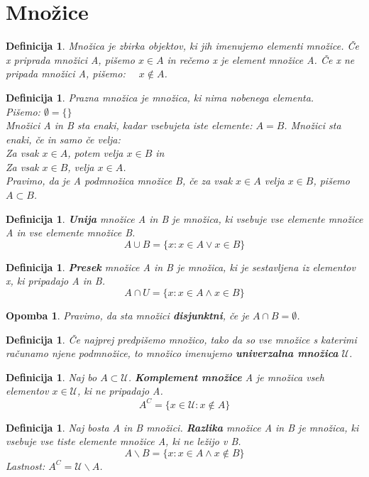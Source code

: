\documentclass[11pt]{article}
\newtheorem{Definicija}[Izrek]{{\sc Definicija}}
\newtheorem{Opomba}[Izrek]{{\sc Opomba}}
\begin{document}
\section{Množice}
\begin{Definicija}
	Množica je zbirka objektov, ki jih imenujemo elementi množice. Če x priprada množici A, pišemo $x\in A$ in rečemo x je element množice A.
	Če x ne pripada množici A, pišemo: $\quad x\notin A$.
\end{Definicija}
\begin{Definicija}
	Prazna množica je množica, ki nima nobenega elementa. \\
	Pišemo: $\emptyset = \{\}$
	\\
	Množici A in B sta enaki, kadar vsebujeta iste elemente: $A=B$. Množici sta enaki, če in samo če velja:
	\\
	Za vsak $x\in A$, potem velja $x\in B$ in
	\\
	Za vsak $x\in B$, velja $x\in A$.
	\\
	Pravimo, da je A podmnožica množice B, če za vsak $x\in A $ velja $x\in B$, pišemo $A\subset B$.
\end{Definicija}
\begin{Definicija}
	\textbf{Unija} množice A in B je množica, ki vsebuje vse elemente množice A in vse elemente množice B. 
	$$A \cup B = \{x: x\in A \lor x\in B\}$$
\end{Definicija}
\begin{Definicija}
	\textbf{Presek} množice A in B je množica, ki je sestavljena iz elementov x, ki pripadajo A in B.
	$$A\cap U = \{x: x\in A \land  x \in B\}$$
\end{Definicija}
\begin{Opomba}
	Pravimo, da sta množici \textbf{disjunktni}, če je $A\cap B = \emptyset$.
\end{Opomba}
\begin{Definicija}
	Če najprej predpišemo množico, tako da so vse množice s katerimi računamo njene podmnožice, to množico imenujemo \textbf{univerzalna množica } $\mathcal{U}$.
\end{Definicija}
\begin{Definicija}
	Naj bo $A \subset \mathcal{U}$. \textbf{Komplement množice} A je množica vseh elementov $x\in \mathcal{U}$, ki ne pripadajo A.
	$$A^C = \{x\in\mathcal{U}: x\notin A \}$$
\end{Definicija}
\begin{Definicija}
	Naj bosta A in B množici. \textbf{Razlika} množice A in B je množica, ki vsebuje vse tiste elemente množice A, ki ne ležijo v B.
	$$A\backslash B = \{x: x\in A \land x\notin B \}$$
	Lastnost: $A^C = \mathcal{U}\backslash A$.
\end{Definicija}
\end{document}
